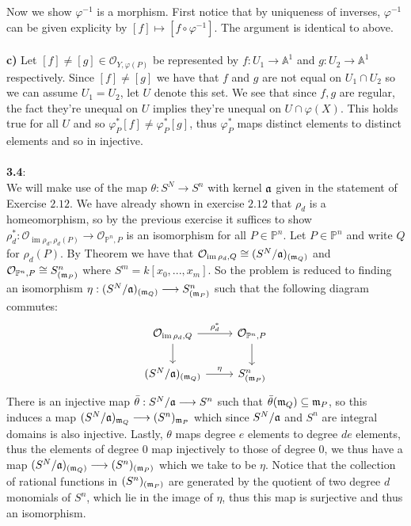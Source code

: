 \documentclass[12pt]{article}
\numberwithin{thm}{subsection}
\numberwithin{defn}{subsection}
\numberwithin{lemma}{subsection}
\numberwithin{example}{subsection}
\numberwithin{notation}{subsection}
\numberwithin{cor}{subsection}
\numberwithin{remark}{subsection}
\numberwithin{condition}{subsection}
\numberwithin{question}{subsection}
\numberwithin{construction}{subsection}
\numberwithin{construction}{subsection}
\numberwithin{construction}{subsection}
\newcommand{\bb}[1]{\mathbb{#1}}
\newcommand{\call}[1]{\mathcal{#1}}
\newcommand{\lto}{\longrightarrow}
\newcommand{\im}{\operatorname{im}}
\begin{document}
Now we show $\varphi^{-1}$ is a morphism. First notice that by uniqueness of inverses, $\varphi^{-1}$ can be given explicity by $[f] \mapsto [f \circ \varphi^{-1}]$. The argument is identical to above.\\\\
%
\textbf{c)} Let $[f] \neq [g] \in \call{O}_{Y,\varphi(P)}$ be represented by $f:U_1 \lto \bb{A}^1$ and $g: U_2 \lto \bb{A}^1$ respectively. Since $[f] \neq [g]$ we have that $f$ and $g$ are not equal on $U_1 \cap U_2$ so we can assume $U_1 = U_2$, let $U$ denote this set. We see that since $f,g$ are regular, the fact they're unequal on $U$ implies they're unequal on $U \cap \varphi(X)$. This holds true for all $U$ and so $\varphi^\ast_P[f] \neq \varphi^\ast_P[g]$, thus $\varphi^\ast_P$ maps distinct elements to distinct elements and so in injective.\\\\
%
\textbf{3.4}:\\
We will make use of the map $\theta: S^N \lto S^n$ with kernel $\frak{a}$ given in the statement of Exercise $2.12$. We have already shown in exercise $2.12$ that $\rho_d$ is a homeomorphism, so by the previous exercise it suffices to show $\rho_d^\ast: \call{O}_{\im \rho_d, \rho_d(P)} \lto \call{O}_{\bb{P}^n,P}$ is an isomorphism for all $P \in \bb{P}^n$. Let $P \in \bb{P}^n$ and write $Q$ for $\rho_d(P)$. By Theorem \cite[\S I 3.3 3.5]{hartshorne} we have that $\call{O}_{\im \rho_d, Q} \cong (S^N/\frak{a})_{(\frak{m}_{Q})}$ and $\call{O}_{\bb{P}^n,P} \cong S^n_{(\frak{m}_P)}$ where $S^m = k[x_0,...,x_m]$. So the problem is reduced to finding an isomorphism $\eta: (S^N/\frak{a})_{(\frak{m}_{Q})} \lto S^n_{(\frak{m}_P)}$ such that the following diagram commutes:
\begin{equation}
\label{eq:threepointfour}
\begin{tikzcd}
\call{O}_{\im \rho_d, Q}\arrow[r,"{\rho_d^\ast}"]\arrow[d] & \call{O}_{\bb{P}^n,P}\arrow[d]\\
(S^N/\frak{a})_{(\frak{m}_{Q})}\arrow[r,"{\eta}"] & S^n_{(\frak{m}_P)}
\end{tikzcd}
\end{equation}
There is an injective map $\bar{\theta}: S^N/\frak{a} \lto S^n$ such that $\bar{\theta}(\frak{m}_{Q}) \subseteq \frak{m}_P$, so this induces a map $(S^N/\frak{a})_{\frak{m}_{Q}} \lto (S^n)_{\frak{m}_P}$ which since $S^N/\frak{a}$ and $S^n$ are integral domains is also injective. Lastly, $\theta$ maps degree $e$ elements to degree $de$ elements, thus the elements of degree $0$ map injectively to those of degree $0$, we thus have a map $(S^N/\frak{a})_{(\frak{m}_{Q})} \lto (S^n)_{(\frak{m}_P)}$ which we take to be $\eta$. Notice that the collection of rational functions in $(S^n)_{(\frak{m}_P)}$ are generated by the quotient of two degree $d$ monomials of $S^n$, which lie in the image of $\eta$, thus this map is surjective and thus an isomorphism.\\\\
\end{document}
